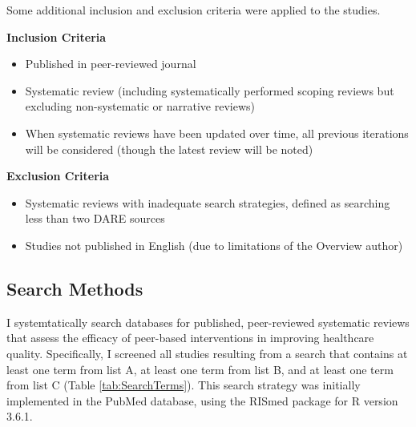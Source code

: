 \documentclass[12pt]{article}
\begin{document}
Some additional inclusion and exclusion criteria were applied to the studies.

\noindent \textbf{Inclusion Criteria}
\begin{itemize}
  \item Published in peer-reviewed journal
  \item Systematic review (including systematically performed scoping reviews but excluding non-systematic or narrative reviews)
  \item When systematic reviews have been updated over time, all previous iterations will be considered (though the latest review will be noted)
\end{itemize}

\noindent \textbf{Exclusion Criteria}
\begin{itemize}
  \item Systematic reviews with inadequate search strategies, defined as searching less than two DARE sources
  \item Studies not published in English (due to limitations of the Overview author)
\end{itemize}


\subsection{Search Methods}

I systemtatically search databases for published, peer-reviewed systematic reviews that assess the efficacy of peer-based interventions in improving healthcare quality. Specifically, I screened all studies resulting from a search that contains at least one term from list A, at least one term from list B, and at least one term from list C (Table \ref{tab:SearchTerms}). This search strategy was initially implemented in the PubMed database, using the RISmed package for R version 3.6.1.
\end{document}
